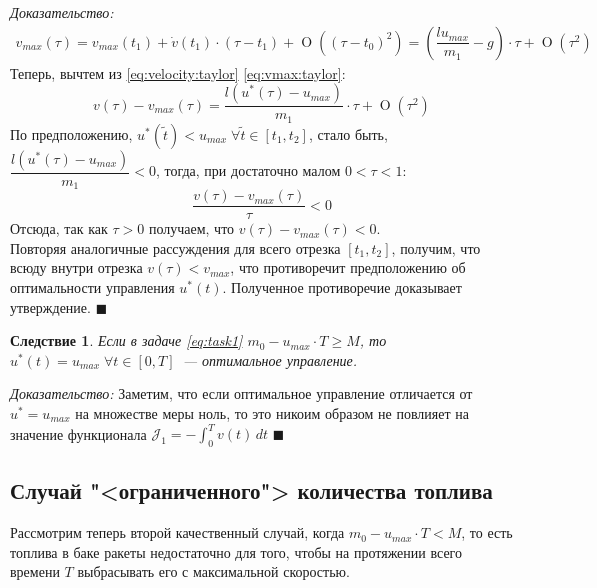 \documentclass[11pt, oneside, final]{article}
\theoremstyle{break}
\numberwithin{equation}{section}
\theoremstyle{plain}
\newtheorem*{corollary*}{Следствие}
\theoremstyle{definition}
\renewenvironment{proof}{
\noindent\textit{Доказательство: }} {\qed}
\renewcommand \qed{$\blacksquare$}
\DeclareMathOperator{\bigO}{O}
\begin{document}
\begin{proof}
\begin{gather}
        \label{eq:vmax:taylor}
        v_{max}(\tau) = v_{max}(t_1) + \dot v(t_1) \cdot (\tau - t_1) + \bigO((\tau - t_0)^2) = ( \dfrac{lu_{max}}{m_1}  - g) \cdot \tau + \bigO(\tau^2)
    \end{gather}
    Теперь, вычтем из \eqref{eq:velocity:taylor} \eqref{eq:vmax:taylor}:
    \begin{equation*}
        v(\tau) - v_{max}(\tau) = \dfrac{l(u^*(\tau) - u_{max})}{m_1} \cdot \tau + \bigO(\tau^2)
    \end{equation*}
    По предположению, \(u^*(\tilde t) < u_{max} \;\forall \tilde t \in [t_1, t_2]\), стало быть, \(\dfrac{l(u^*(\tau) - u_{max})}{m_1} < 0\), тогда, при достаточно малом \(0 < \tau < 1\): 
    \begin{equation}
        \dfrac{v(\tau) - v_{max}(\tau)}{\tau} < 0
    \end{equation}
    Отсюда, так как \(\tau > 0\) получаем, что \(v(\tau) - v_{max}(\tau) < 0\). \\
    Повторяя аналогичные рассуждения для всего отрезка \([t_1, t_2]\), получим, что всюду внутри отрезка \(v(\tau) < v_{max}\), что противоречит предположению об оптимальности управления \(u^*(t)\). Полученное противоречие доказывает утверждение.
    \end{proof}
    \begin{corollary*}
        Если в задаче \eqref{eq:task1} \(m_0 - u_{max} \cdot T \geqslant M\), то \(u^*(t) = u_{max}\; \forall t \in [0, T] \)~--- оптимальное управление.
    \end{corollary*}
    \begin{proof}
        Заметим, что если оптимальное управление отличается от \(u^* = u_{max}\) на множестве меры ноль, то это никоим образом не повлияет на значение функционала \(\mathcal{J}_1 = - \int_0^T{v(t) \, dt} \)
    \end{proof}
    \subsection{Случай "<ограниченного"> количества топлива}
    Рассмотрим теперь второй качественный случай, когда \(m_0 - u_{max} \cdot T < M\), то есть топлива в баке ракеты недостаточно для того, чтобы на протяжении всего времени \(T\) выбрасывать его с максимальной скоростью.
\end{document}

